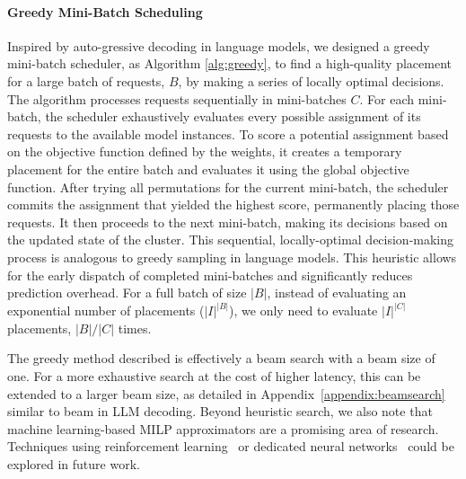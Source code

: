 \documentclass[letterpaper, anonymous, twocolumn, 10pt]{article}
\begin{document}
\paragraph{Greedy Mini-Batch Scheduling}
Inspired by auto-gressive decoding in language models, we designed a greedy mini-batch scheduler, as Algorithm \ref{alg:greedy}, to find a high-quality placement for a large batch of requests, $B$, by making a series of locally optimal decisions. The algorithm processes requests sequentially in mini-batches $C$. For each mini-batch, the scheduler exhaustively evaluates every possible assignment of its requests to the available model instances. To score a potential assignment based on the objective function defined by the weights, it creates a temporary placement for the entire batch and evaluates it using the global objective function. After trying all permutations for the current mini-batch, the scheduler commits the assignment that yielded the highest score, permanently placing those requests. It then proceeds to the next mini-batch, making its decisions based on the updated state of the cluster. This sequential, locally-optimal decision-making process is analogous to greedy sampling in language models. This heuristic allows for the early dispatch of completed mini-batches and significantly reduces prediction overhead. For a full batch of size $|B|$, instead of evaluating an exponential number of placements ($|I|^{|B|}$), we only need to evaluate $|I|^{|C|}$ placements, $|B|/|C|$ times.

The greedy method described is effectively a beam search with a beam size of one. For a more exhaustive search at the cost of higher latency, this can be extended to a larger beam size, as detailed in Appendix~\ref{appendix:beamsearch} similar to beam in LLM decoding. Beyond heuristic search, we also note that machine learning-based MILP approximators are a promising area of research. Techniques using reinforcement learning~\cite{lee2025rlsphlearningachievefeasible} or dedicated neural networks~\cite{nair2021solvingmixedintegerprograms} could be explored in future work.
\end{document}
